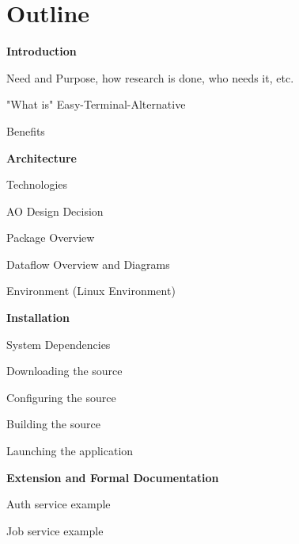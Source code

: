 \documentclass[a4paper,12pt]{texMemo}
\begin{document}
\section{Outline}
\begin{outline}
\item {\bf Introduction }
	\begin{outline}
	\item { Need and Purpose, how research is done, who needs it, etc.} \\
	\item { "What is" Easy-Terminal-Alternative } \\
	\item { Benefits}
	\end{outline}
\item {\bf Architecture}
	\begin{outline}
	\item { Technologies} \\	
	\item { AO Design Decision} \\
	\item { Package Overview} \\
	\item { Dataflow Overview and Diagrams} \\
	\item { Environment (Linux Environment)} \\
	\end{outline}
\item {\bf Installation}
	\begin{outline}
	\item { System Dependencies } \\
	\item { Downloading the source} \\
	\item { Configuring the source } \\
	\item { Building the source} \\
	\item { Launching the application} \\
	\end{outline}
\item {\bf Extension and Formal Documentation}
	\begin{outline}
	\item { Auth service example} \\
	\item { Job service example} \\

\end{outline}
\end{outline}
\end{document}
